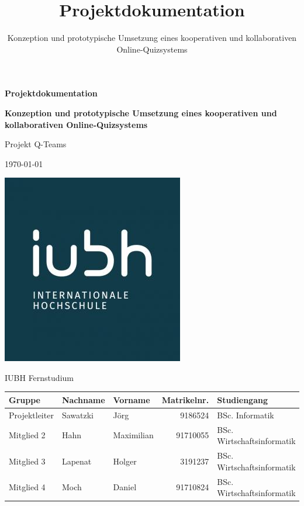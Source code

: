 \documentclass[a4paper,11pt,listof=numbered,glossary=totoc,parskip=half,toc=bib]{scrreprt}
\title{Projektdokumentation}
\subtitle{Konzeption und prototypische Umsetzung eines kooperativen und kollaborativen Online‐Quizsystems}
\begin{document}
	\begin{titlepage}
		
		\centering
		\vspace*{2.5cm}
		{\large\bfseries \par}	
		{\Huge\bfseries Projektdokumentation\par}
		{\Large\bfseries Konzeption und prototypische Umsetzung eines kooperativen und kollaborativen Online‐Quizsystems \par}

		{\Large Projekt Q-Teams\par}
		{\large\today\par}
		\vspace{0.5cm}

			
		
		\includegraphics[scale=0.5]{iubh_logo}
		
		IUBH Fernstudium
		\vspace{0.5cm}
		
		\begin{tabular}{lllrl}
			\toprule
			\textbf{Gruppe} & \textbf{Nachname} & \textbf{Vorname} & \textbf{Matrikelnr.} & \textbf{Studiengang} \\
			\midrule
			Projektleiter & Sawatzki & Jörg & 9186524 & BSc. Informatik \\
			Mitglied 2 & Hahn & Maximilian & 91710055 & BSc. Wirtschaftsinformatik \\
			Mitglied 3 & Lapenat & Holger & 3191237 & BSc. Wirtschaftsinformatik \\
			Mitglied 4 & Moch & Daniel & 91710824 & BSc. Wirtschaftsinformatik \\
			\bottomrule
		\end{tabular}	
	\end{titlepage}
	
\end{document}
